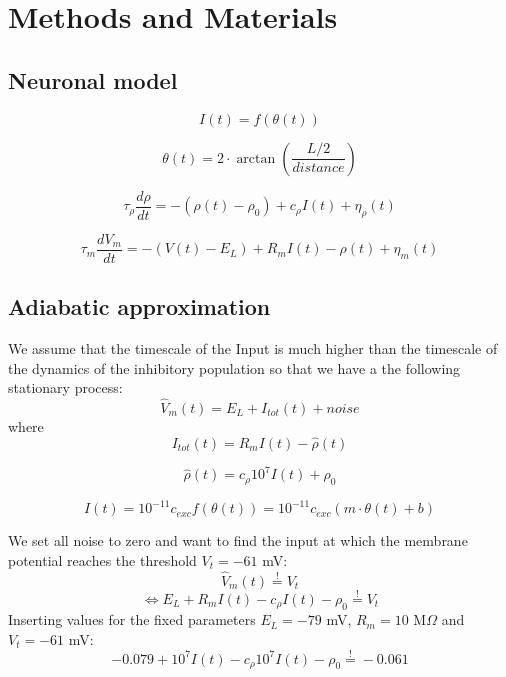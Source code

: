 \documentclass[a4paper,10pt,hidelinks]{scrreprt}
\begin{document}
	\chapter{Methods and Materials}
	\section{Neuronal model}
	\begin{equation}
	I(t) = f(\theta (t))
	\label{eq:input}
	\end{equation}
	
	\begin{equation}
	\theta (t) = 2\cdot \arctan(\frac{L/2}{distance})
	\label{eq:theta}
	\end{equation}
	
	\begin{equation}
	\tau _{\rho} \frac{d\rho}{dt} = - (\rho(t) - \rho_{0}) + c_{\rho} I(t) + 
	\eta _{\rho}(t)
	\label{eq:inhib}
	\end{equation}
	
	\begin{equation}
	\tau _m \frac{dV_m}{dt} = - (V(t) - E_{L}) + R_{m} I(t) - \rho (t) +  \eta 
	_m (t)
	\label{eq:mcell}
	\end{equation}
	
	
	\section{Adiabatic approximation}
	We assume that the timescale of the Input is much higher than the timescale 
	of the dynamics of the inhibitory population so that we have a the 
	following stationary process:
	\begin{equation}
	\hat{V}_m(t) = E_{L} + I_{tot}(t) + noise
	\end{equation}
	where
	\begin{equation}
	I_{tot}(t) = R_{m} I(t) - \hat{\rho}(t)
	\end{equation}
	
	\begin{equation}
	\hat{\rho}(t) = c_{\rho} 10^{7} I(t) + \rho_{0}
	\end{equation}
	
	\begin{equation}
	I(t) = 10^{-11} c_{exc} f(\theta(t)) = 10^{-11} c_{exc} (m \cdot \theta(t) 
	+ b)
	\end{equation}
	
	We set all noise to zero and want to find the input at which the membrane 
	potential reaches the threshold $V_{t}=-61$ mV:
	\begin{equation}
	\hat{V}_m(t) \overset{!}{=} V_t
	\end{equation}
	\begin{equation}
	\Leftrightarrow E_{L} + R_{m} I(t) - c_{\rho} I(t) - \rho_{0} 
	\overset{!}{=} V_t
	\end{equation}
	Inserting values for the fixed parameters $E_{L}=-79$ mV, $R_{m}=10$ 
	M$\Omega$ 
	and $V_{t}=-61$ mV:
	\begin{equation}
	-0.079 + 10^{7} I(t) - c_{\rho} 10^{7} I(t) - \rho_{0} \overset{!}{=} -0.061
	\end{equation}
	
\end{document}
